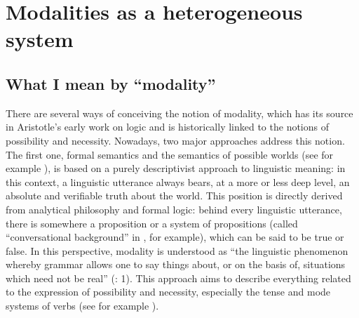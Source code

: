 \documentclass[output=paper]{langscibook}
\begin{document}
\section{Modalities as a heterogeneous system}
\subsection{What I mean by “modality”}\label{sec:09:2.1}

There are several ways of conceiving the notion of modality, which has its source in Aristotle's early work on logic and is historically linked to the notions of possibility and necessity. Nowadays, two major approaches address this notion. The first one, formal semantics and the semantics of possible worlds (see for example \citealt{Portner2009,Portner2018}), is based on a purely descriptivist approach to linguistic meaning: in this context, a linguistic utterance always bears, at a more or less deep level, an absolute and verifiable truth about the world. This position is directly derived from analytical philosophy and formal logic: behind every linguistic utterance, there is somewhere a proposition or a system of propositions (called “conversational background” in \citealt{Kratzer1977}, for example), which can be said to be true or false. In this perspective, modality is understood as “the linguistic phenomenon whereby grammar allows one to say things about, or on the basis of, situations which need not be real” (\citealt{Portner2009}: 1). This approach aims to describe everything related to the expression of possibility and necessity, especially the tense and mode systems of verbs (see for example \citealt{Mari2015}).
\end{document}
